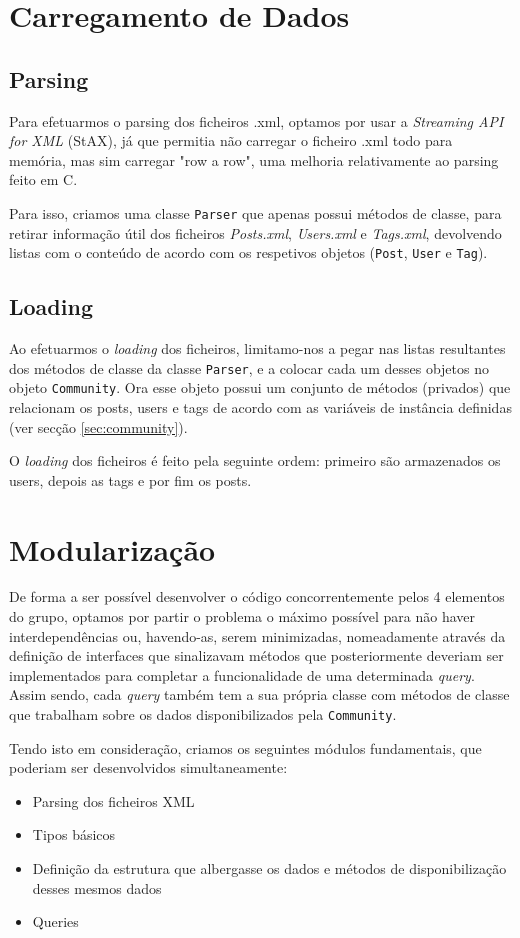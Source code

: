 \documentclass[a4paper]{article}
\begin{document}
\section{Carregamento de Dados}
	\subsection{Parsing}
		\tab Para efetuarmos o parsing dos ficheiros .xml, optamos por usar a
		\textit{Streaming API for XML} (StAX), já que permitia não carregar o ficheiro
		.xml todo para memória, mas sim carregar "row a row", uma melhoria relativamente
		ao parsing feito em C.
		\par Para isso, criamos uma classe \texttt{Parser} que apenas possui métodos
		de classe, para retirar informação útil dos ficheiros \textit{Posts.xml}, \textit{Users.xml}
		e \textit{Tags.xml}, devolvendo listas com o conteúdo de acordo com os respetivos
		objetos (\texttt{Post}, \texttt{User} e \texttt{Tag}).

	\subsection{Loading}
		\tab Ao efetuarmos o \textit{loading} dos ficheiros, limitamo-nos a pegar nas listas resultantes
		dos métodos de classe da classe \texttt{Parser}, e a colocar cada um desses objetos
		no objeto \texttt{Community}. Ora esse objeto possui um conjunto de métodos (privados)
		que relacionam os posts, users e tags de acordo com as variáveis de instância definidas
		(ver secção \ref{sec:community}).
		\par O \textit{loading} dos ficheiros é feito pela seguinte ordem: primeiro são
		armazenados os users, depois as tags e por fim os posts.

\section{Modularização}
	\tab De forma a ser possível desenvolver o código concorrentemente pelos 4 elementos
	do grupo, optamos por partir o problema o máximo possível para não haver interdependências ou,
	havendo-as, serem minimizadas, nomeadamente através da definição de interfaces que sinalizavam
	métodos que posteriormente deveriam ser implementados para completar a funcionalidade de uma
	determinada \textit{query}. Assim sendo, cada \textit{query} também tem a sua própria classe com
	métodos de classe que trabalham sobre os dados disponibilizados pela \texttt{Community}.
	\par Tendo isto em consideração, criamos os seguintes módulos fundamentais, que poderiam
	ser desenvolvidos simultaneamente:
		\begin{itemize}
			\item Parsing dos ficheiros XML
			\item Tipos básicos
			\item Definição da estrutura que albergasse os dados e métodos de disponibilização
			desses mesmos dados
			\item Queries
		\end{itemize}
\end{document}
